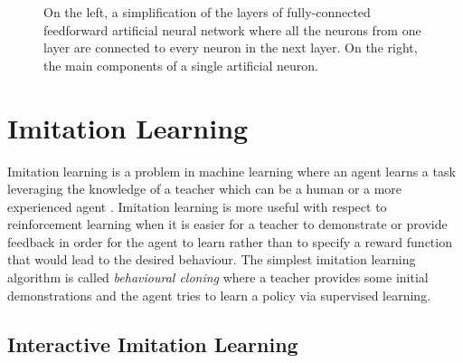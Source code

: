 
  
  
  
   \begin{figure}[H]
  \centering
  \subfloat{{%
  }}
   \hfill
  \subfloat{{%
  }}

  \caption{On the left, a simplification of the layers of fully-connected feedforward artificial neural network where all the neurons from one layer are connected to every neuron in the next layer. On the right, the main components of a single artificial neuron.}
  \label{fig:nn}
\end{figure}
















\section{Imitation Learning}
\label{section:Imitation Learning}

Imitation learning is a problem in machine learning where an agent learns a task leveraging the knowledge of a teacher which can be a human or a more experienced agent \cite{Imitation-Learning-definition-torabi:2019}. Imitation learning is more useful with respect to reinforcement learning when it is easier for a teacher to demonstrate or provide feedback in order for the agent to learn rather than to specify a reward function that would lead to the desired behaviour. The simplest imitation learning algorithm is called \textit{behavioural cloning} where a teacher provides some initial demonstrations and the agent tries to learn a policy via supervised learning.




\subsection{Interactive Imitation Learning}
\label{subsubsection:Interactive-Imitation-Learning}

